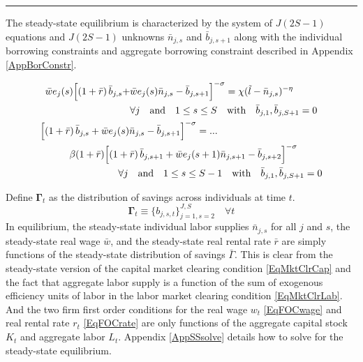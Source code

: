 \documentclass[letterpaper,12pt]{article}
\theoremstyle{definition}
\begin{document}
    \hrule
    \begin{spacing}{1.5}
    \vspace{10mm}

    The steady-state equilibrium is characterized by the system of $J(2S-1)$ equations and $J(2S-1)$ unknowns $\bar{n}_{j,s}$ and $\bar{b}_{j,s+1}$ along with the individual borrowing constraints and aggregate borrowing constraint described in Appendix \ref{AppBorConstr}.

    \begin{gather}
      \begin{split}
        \bar{w}e_j(s)\Bigl[\left(1+\bar{r}\right)\bar{b}_{j,s} + &\bar{w} e_j(s)\bar{n}_{j,s} - \bar{b}_{j,s+1}\Bigr]^{-\sigma} = \chi(\tilde{l} - \bar{n}_{j,s})^{-\eta} \\
        &\forall j \quad\text{and}\quad 1\leq s\leq S \quad\text{with}\quad \bar{b}_{j,1},\bar{b}_{j,S+1}=0
      \end{split} \label{EqEulerLabGenSS} \\
      \begin{split}
        &\Bigl[\left(1+\bar{r}\right)\bar{b}_{j,s} + \bar{w}e_j(s)\bar{n}_{j,s} - \bar{b}_{j,s+1}\Bigr]^{-\sigma} = ... \\
        &\quad\quad\quad \beta(1+\bar{r})\Bigl[\left(1+\bar{r}\right)\bar{b}_{j,s+1} + \bar{w}e_j(s+1)\bar{n}_{j,s+1} - \bar{b}_{j,s+2}\Bigr]^{-\sigma} \\
        &\quad\quad\quad\quad\quad\quad\quad\quad\forall j \quad\text{and}\quad 1\leq s\leq S-1 \quad\text{with}\quad \bar{b}_{j,1},\bar{b}_{j,S+1}=0
      \end{split} \label{EqEulerSavGenSS}
    \end{gather}

    Define $\bm{\Gamma}_t$ as the distribution of savings across individuals at time $t$.
    \begin{equation}\label{EqSavDist}
      \bm{\Gamma}_t \equiv \{b_{j,s,t}\}_{j=1,s=2}^{J,S} \quad\forall t
    \end{equation}
    In equilibrium, the steady-state individual labor supplies $\bar{n}_{j,s}$ for all $j$ and $s$, the steady-state real wage $\bar{w}$, and the steady-state real rental rate $\bar{r}$ are simply functions of the steady-state distribution of savings $\bar{\Gamma}$. This is clear from the steady-state version of the capital market clearing condition \eqref{EqMktClrCap} and the fact that aggregate labor supply is a function of the sum of exogenous efficiency units of labor in the labor market clearing condition \eqref{EqMktClrLab}. And the two firm first order conditions for the real wage $w_t$ \eqref{EqFOCwage} and real rental rate $r_t$ \eqref{EqFOCrate} are only functions of the aggregate capital stock $K_t$ and aggregate labor $L_t$. Appendix \ref{AppSSsolve} details how to solve for the steady-state equilibrium.


\end{spacing}
\end{document}
